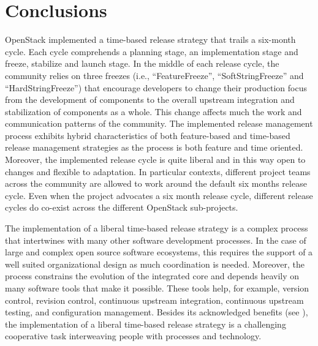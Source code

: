 \documentclass[dvipsnames]{bmcart}
\theoremstyle{definition}
\begin{document}












\section{Conclusions}


OpenStack implemented a time-based release strategy that trails a six-month cycle. Each cycle comprehends a planning stage, an implementation stage and freeze, stabilize and launch stage.
In the middle of each release cycle, the community relies on three freezes (i.e., “FeatureFreeze”, “SoftStringFreeze” and “HardStringFreeze”) that encourage developers to change their production focus from the development of components to the overall upstream integration and stabilization of components as a whole. This change affects much the work and communication patterns of the community. The implemented release management process exhibits hybrid characteristics of both feature-based and time-based release management strategies as the process is both feature and time oriented. Moreover, the implemented release cycle is quite liberal and in this way open to changes and flexible to adaptation. In particular contexts, different project teams across the community are allowed to work around the default six months release cycle. Even when the project advocates a six month release cycle, different release cycles do co-exist across the different OpenStack sub-projects.

The implementation of a liberal time-based release strategy is a complex process that intertwines with many other software development processes. In the case of large and complex open source software ecosystems, this requires the support of a well suited organizational design as much coordination is needed. Moreover, the process constrains the evolution of the integrated core and depends heavily on many software tools that make it possible. These tools help, for example, version control, revision control, continuous upstream integration, continuous upstream testing, and configuration management. Besides its acknowledged benefits (see \cite{michlmayr2012time}), the implementation of a liberal time-based release strategy is a challenging cooperative task interweaving people with processes and technology.
\end{document}
